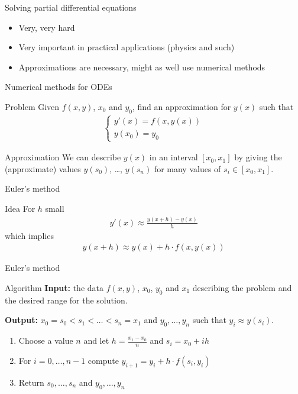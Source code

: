 \documentclass[11pt]{beamer}
\begin{document}
\begin{frame}{Solving partial differential equations}
	\begin{itemize}
		\item Very, very hard
		\item Very important in practical applications (physics and such)
		\item Approximations are necessary, might as well use numerical methods
	\end{itemize}
\end{frame}

\begin{frame}{Numerical methods for ODEs}
	\begin{block}{Problem}
		Given $f(x,y)$, $x_0$ and $y_0$, find an approximation
		for $y(x)$ such that
		\begin{align*}
			\begin{cases}
				y'(x) = f(x, y(x))\\
				y(x_0) =y_0
			\end{cases}
		\end{align*}
	\end{block}

	\begin{block}{Approximation}
		We can describe $y(x)$ in an interval $[x_0,x_1]$ by giving the
		(approximate) values $y(s_0)$, \dots, $y(s_n)$ for many
		values of $s_i\in [x_0, x_1]$.
	\end{block}
\end{frame}

\begin{frame}{Euler's method}
	\begin{block}{Idea}
		For $h$ small
		\begin{align*}
			y'(x)\approx\frac{y(x+h)-y(x)}{h}
		\end{align*}
		which implies
		\begin{align*}
			y(x+h) \approx y(x) + h\cdot f(x, y(x))
		\end{align*}
	\end{block}
\end{frame}

\begin{frame}{Euler's method}
	\begin{block}{Algorithm}
		\textbf{Input:} the data $f(x,y)$, $x_0$, $y_0$ and $x_1$ describing
			the problem and the desired range for the solution.

		\vspace{0.3cm}
		\textbf{Output:} $x_0=s_0 < s_1 < \dots < s_n=x_1$ and
			$y_0, \dots, y_n$ such that $y_i\approx y(s_i)$.

		\vspace{0.3cm}
		\begin{enumerate}
			\item Choose a value $n$ and let
				$h=\frac{x_1-x_0}{n}$ and $s_i=x_0+ih$
			\item For $i=0,\dots, n-1$ compute
				$y_{i+1}=y_i+h\cdot f(s_i, y_i)$
			\item Return $s_0, \dots, s_n$ and $y_0, \dots, y_n$
		\end{enumerate}
	\end{block}
\end{frame}
\end{document}
